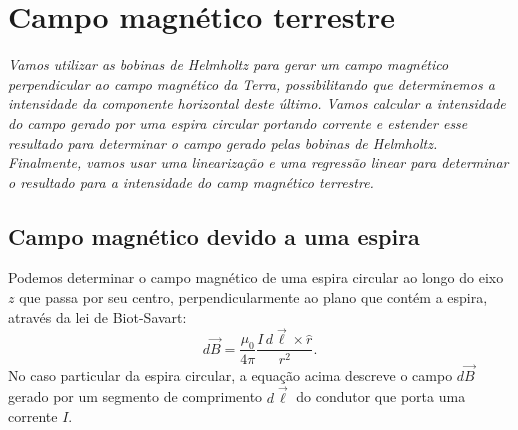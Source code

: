 \chapter{Campo magnético terrestre} %
\label{Chap:CampoMagTerrestre}        %

\begin{fullwidth}\it
	Vamos utilizar as bobinas de Helmholtz para gerar um campo magnético perpendicular ao campo magnético da Terra, possibilitando que determinemos a intensidade da componente horizontal deste último. Vamos calcular a intensidade do campo gerado por uma espira circular portando corrente e estender esse resultado para determinar o campo gerado pelas bobinas de Helmholtz. Finalmente, vamos usar uma linearização e uma regressão linear para determinar o resultado para a intensidade do camp magnético terrestre. 
\end{fullwidth}

\section{Campo magnético devido a uma espira}

Podemos determinar o campo magnético de uma espira circular ao longo do eixo $z$ que passa por seu centro, perpendicularmente ao plano que contém a espira, através da lei de Biot-Savart:
\begin{equation}
    d\vec{B} = \frac{\mu_0}{4\pi} \frac{I\, d\vec{\ell} \times \hat{r}}{r^2}.
\end{equation}
%
No caso particular da espira circular, a equação acima descreve o campo $d\vec{B}$ gerado por um segmento de comprimento $d\vec{\ell}$ do condutor que porta uma corrente $I$.

